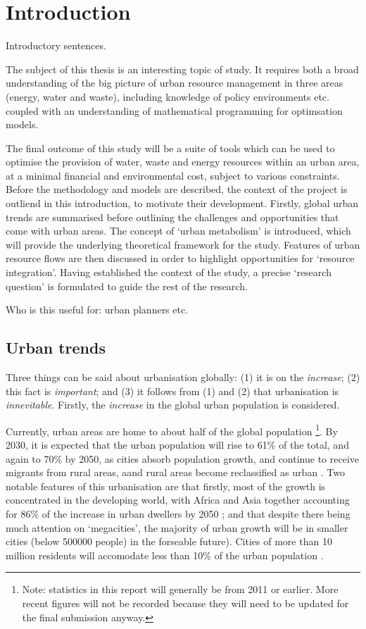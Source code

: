 \section{Introduction}
Introductory sentences.

The subject of this thesis is an interesting topic of study. It requires both a broad understanding of the big picture of urban resource management in three areas (energy, water and waste), including knowledge of policy environments etc. coupled with an understanding of mathematical programming for optimsation models.

The final outcome of this study will be a suite of tools which can be used to optimise the provision of water, waste and energy resources within an urban area, at a minimal financial and environmental cost, subject to various constraints. Before the methodology and models are described, the context of the project is outliend in this introduction, to motivate their development. Firstly, global urban trends are summarised before outlining the challenges and opportunities that come with urban areas. The concept of `urban metabolism' is introduced, which will provide the underlying theoretical framework for the study. Features of urban resource flows are then discussed in order to highlight opportunities for `resource integration'. Having established the context of the study, a precise `research question' is formulated to guide the rest of the research.

Who is this useful for: urban planners etc.

\subsection{Urban trends}
Three things can be said about urbanisation globally: (1) it is on the \emph{increase}; (2) this fact is \emph{important}; and (3) it follows from (1) and (2) that urbanisation is \emph{innevitable}. Firstly, the \emph{increase} in the global urban population is considered.

Currently, urban areas are home to about half of the global population \citep{AREAS2012}\footnote{Note: statistics in this report will generally be from 2011 or earlier. More recent figures will not be recorded because they will need to be updated for the final submission anyway.}. By 2030, it is expected that the urban population will rise to 61\% of the total, and again to 70\% by 2050, as cities absorb population growth, and continue to receive migrants from rural areas, aand rural areas become reclassified as urban \citep{Cohen2006}. Two notable features of this urbanisation are that firstly, most of the growth is concentrated in the developing world, with Africa and Asia together accounting for 86\% of the increase in urban dwellers by 2050 \citep{York2011}; and that despite there being much attention on `megacities', the majority of urban growth will be in smaller cities (below 500000 people) in the forseable future). Cities of more than 10 million residents will accomodate less than 10\% of the urban population \citep{Cohen2006}.

